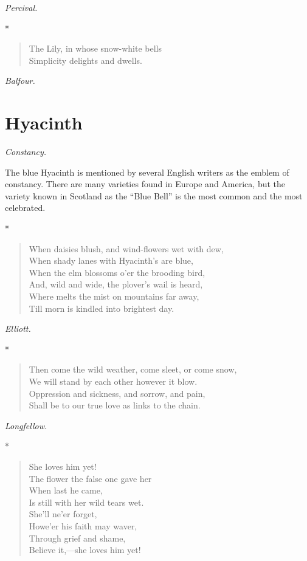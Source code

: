 \documentclass[11pt,twoside]{article}
\newcommand\flower[2]{\section*{#1}\addcontentsline{toc}{section}{#1}%
  \noindent\textit{#2.}\par\medskip}
\newcommand\stars{\begin{center}*\quad*\quad*\end{center}}
\newcommand\by[1]{\par\hfill\textit{#1}\par}
\begin{document}
\by{Percival.}

\stars

\begin{verse}
The Lily, in whose snow-white bells\\
Simplicity delights and dwells.
\end{verse}

\by{Balfour.}

\flower{Hyacinth}{Constancy}

The blue Hyacinth is mentioned by several English writers as the emblem of constancy. There are many varieties found in Europe and America, but the variety known in Scotland as the “Blue Bell” is the most common and the most celebrated.

\stars

\begin{verse}
When daisies blush, and wind-flowers wet with dew,\\
When shady lanes with Hyacinth’s are blue,\\
When the elm blossoms o’er the brooding bird,\\
And, wild and wide, the plover’s wail is heard,\\
Where melts the mist on mountains far away,\\
Till morn is kindled into brightest day.
\end{verse}

\by{Elliott.}

\stars

\begin{verse}
Then come the wild weather, come sleet, or come snow,\\
We will stand by each other however it blow.\\
Oppression and sickness, and sorrow, and pain,\\
Shall be to our true love as links to the chain.
\end{verse}

\by{Longfellow.}

\stars

\begin{verse}
\quad She loves him yet!\\
The flower the false one gave her\\
\quad When last he came,\\
Is still with her wild tears wet.\\
\quad She’ll ne’er forget,\\
Howe’er his faith may waver,\\
\quad Through grief and shame,\\
Believe it,---she loves him yet!
\end{verse}
\end{document}
